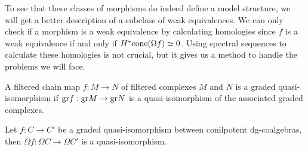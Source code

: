 \documentclass[../thesis.tex]{subfiles}
\begin{document}
            To see that these classes of morphisms do indeed define a model structure, we will get a better description of a subclass of weak equivalences. We can only check if a morphism is a weak equivalence by calculating homologies since $f$ is a weak equivalence if and only if $H^*\tt{cone}(\Omega f) \simeq 0$. Using spectral sequences to calculate these homologies is not crucial, but it gives us a method to handle the problems we will face.

            \begin{definition}
                A filtered chain map $f: M \rightarrow N$ of filtered complexes $M$ and $N$ is a graded quasi-isomorphism if $\tt{gr}f: \tt{gr}M \rightarrow \tt{gr}N$ is a quasi-isomorphism of the associated graded complexes.
            \end{definition}

            \begin{lemma}\label{lem: graded-qif-are-w}
                Let $f: C\rightarrow C'$ be a graded quasi-isomorphism between conilpotent dg-coalgebras, then $\Omega f: \Omega C \rightarrow \Omega C'$ is a quasi-isomorphism. 
            \end{lemma}
\end{document}
